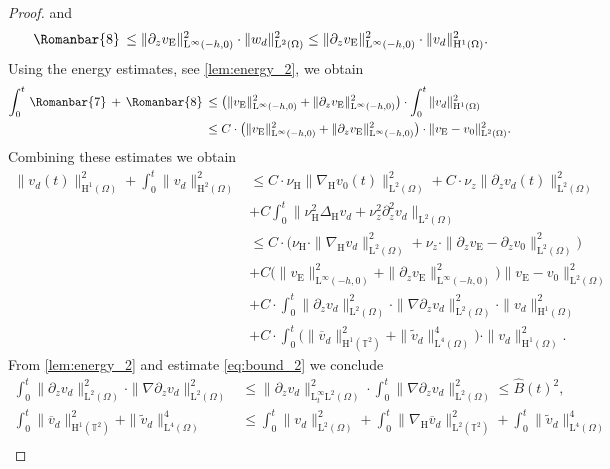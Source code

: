 \documentclass[preprint]{elsarticle}
\numberwithin{equation}{section}
\newcommand {\T}	{\mathbb{T}}
\renewcommand{\H}{\mathrm{H}}
\newcommand{\dk}[1]{\partial_{#1}}
\newcommand{\dz}{\dk{z}}
\renewcommand{\bar}[1]{\overline{#1}}
\newcommand{\vbar}{\bar{v}}
\newcommand{\vtilde}{\tilde{v}}
\newcommand{\nablaH}{\nabla_{\H}}
\newcommand{\DeltaH}{\Delta_{\H}}
\newcommand{\rL}{\mathrm{L}}
\newcommand{\rH}{\H}
\newcommand{\rE}{\mathrm{E}}
\newcommand{\VII}{\, \Romanbar{7}\, }
\newcommand{\VIII}{\, \Romanbar{8}\, }
\begin{document}
\begin{proof}
	and
	\begin{equation*}
		\VIII \leq \| \dz v_{\rE} \|_{\rL^\infty(-h,0)}^2 \cdot \| w_d \|_{\rL^2(\Omega)}^2
		\leq \| \dz v_{\rE} \|_{\rL^\infty(-h,0)}^2 \cdot \| v_d \|_{\rH^1(\Omega)}^2 .
	\end{equation*}
	Using the energy estimates, see \autoref{lem:energy_2}, we obtain
	\begin{align*}
		\int_0^t \VII + \VIII 
		&\leq \bigl( \| v_{\rE} \|_{\rL^\infty(-h,0)}^2 + \| \dz v_{\rE} \|_{\rL^\infty(-h,0)}^2 \bigr) \cdot \int_0^t \| v_d \|_{\rH^1(\Omega)}^2 \\
		&\leq C \cdot \bigl(\| v_{\rE} \|_{\rL^\infty(-h,0)}^2 + \| \dz v_{\rE} \|_{\rL^\infty(-h,0)}^2 \bigr) \cdot \| v_{\rE} - v_0 \|_{\rL^2(\Omega)}^2 .
	\end{align*}
	Combining these estimates we obtain
	\begin{align*}
		\| v_d(t) \|_{\rH^1(\Omega)}^2
		+ \int_0^t \| v_d \|_{\rH^2(\Omega)}^2
		&\leq 
		C \cdot \nu_{\rH} \| \nablaH v_0(t) \|_{\rL^2(\Omega)}^2
		+ C \cdot \nu_z \| \partial_z v_d(t) \|_{\rL^2(\Omega)}^2
		\\
		&+ C \int_0^t \| \nu_{\rH}^2 \DeltaH v_d +\nu_z^2 \partial_z^2 v_d \|_{\rL^2(\Omega)} \\
		&\leq 
		C \cdot \bigl(\nu_{\H} \cdot \| \nablaH v_d \|_{\rL^2(\Omega)}^2 + \nu_z \cdot  \| \dz v_\rE-\dz v_{0} \|_{\rL^2(\Omega)}^2 \bigr)
		\\
		&+C \bigl(\| v_{\rE} \|_{\rL^\infty(-h,0)}^2 + \| \dz v_{\rE} \|_{\rL^\infty(-h,0)}^2 \bigr) \| v_{\rE} - v_0 \|_{\rL^2(\Omega)}^2 \\
		&+ C \cdot \int_0^t \| \partial_z v_d \|_{\rL^2(\Omega)}^2 \cdot \| \nabla \partial_z v_d \|_{\rL^2(\Omega)}^2 \cdot \| v_d \|_{\rH^1(\Omega)}^2 \\
		&+ C \cdot \int_0^t \bigl( \| \vbar_d \|_{\rH^1(\T^2)}^2 + \| \vtilde_d\|_{\rL^4(\Omega)}^4 \bigr) \cdot \| v_d \|_{\rH^1(\Omega)}^2 .
	\end{align*}
	From \autoref{lem:energy_2} and estimate \eqref{eq:bound_2} we conclude
	\begin{align*}
		\int_0^t \| \partial_z v_d \|_{\rL^2(\Omega)}^2 \cdot \| \nabla \partial_z v_d \|_{\rL^2(\Omega)}^2 
		&\leq \| \partial_z v_d \|_{\rL^\infty_t\rL^2(\Omega)}^2 \cdot  \int_0^t \| \nabla \partial_z v_d \|_{\rL^2(\Omega)}^2 
		\leq \hat{B}(t)^2, \\
		\int_0^t \| \vbar_d \|_{\rH^1(\T^2)}^2 + \| \vtilde_d\|_{\rL^4(\Omega)}^4
		&\leq \int_0^t \| v_d \|_{\rL^2(\Omega)}^2
		+
		\int_0^t \| \nablaH \vbar_d \|_{\rL^2(\T^2)}^2 + \int_0^t \| \vtilde_d\|_{\rL^4(\Omega)}^4 \\

\end{align*}
\end{proof}
\end{document}
